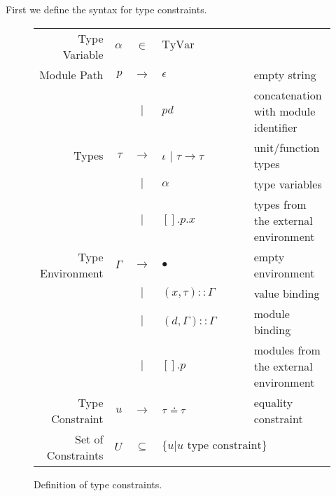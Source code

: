 \documentclass{article}
\theoremstyle{definition}
\newcommand*{\vbar}{|}
\newcommand*{\cons}{::}
\newcommand*{\A}[1]{\overset{\,_{\mbox{\Large .}}}{#1}}
\newcommand*{\modid}{d}
\newcommand*{\TyVar}{\text{TyVar}}
\begin{document}
First we define the syntax for type constraints.
\begin{figure}[h!]
  \centering
  \begin{tabular}{rrcll}
    Type Variable      & $\alpha$ & $\in$         & $\TyVar$                                                                 \\
    Module Path        & $p$      & $\rightarrow$ & $\epsilon$                       & empty string                          \\
                       &          & $\vbar$       & $p\modid$                        & concatenation with module identifier  \\
    Types              & $\tau$   & $\rightarrow$ & $\iota$ | $\tau\rightarrow\tau$  & unit/function types                   \\
                       &          & $\vbar$       & $\alpha$                         & type variables                        \\
                       &          & $\vbar$       & $[].p.x$                         & types from the external environment   \\
    Type Environment   & $\Gamma$ & $\rightarrow$ & $\bullet$                        & empty environment                     \\
                       &          & $\vbar$       & $(x,\tau)\cons \Gamma$           & value binding                         \\
                       &          & $\vbar$       & $(\modid,\Gamma)\cons \Gamma$    & module binding                        \\
                       &          & $\vbar$       & $[].p$                           & modules from the external environment \\
    Type Constraint    & $u$      & $\rightarrow$ & $\tau\A{=}\tau$                  & equality constraint                   \\
    Set of Constraints & $U$      & $\subseteq$   & $\{u|u\text{ type constraint}\}$
  \end{tabular}
  \caption{Definition of type constraints.}
  \label{fig:typeqdom}
\end{figure}
\end{document}
